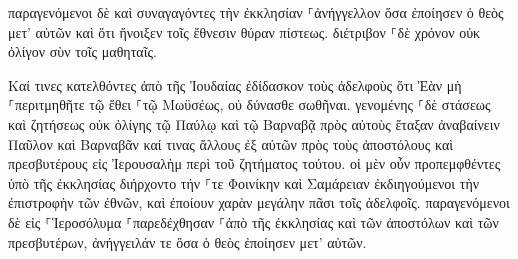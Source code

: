 \documentclass{openreader}
\begin{document}
παραγενόμενοι δὲ καὶ συναγαγόντες τὴν ἐκκλησίαν ⸀ἀνήγγελλον ὅσα ἐποίησεν ὁ θεὸς μετ’ αὐτῶν καὶ ὅτι ἤνοιξεν τοῖς ἔθνεσιν θύραν πίστεως. 
διέτριβον ⸀δὲ χρόνον οὐκ ὀλίγον σὺν τοῖς μαθηταῖς. 

Καί τινες κατελθόντες ἀπὸ τῆς Ἰουδαίας ἐδίδασκον τοὺς ἀδελφοὺς ὅτι Ἐὰν μὴ ⸀περιτμηθῆτε τῷ ἔθει ⸀τῷ Μωϋσέως, οὐ δύνασθε σωθῆναι. 
γενομένης ⸀δὲ στάσεως καὶ ζητήσεως οὐκ ὀλίγης τῷ Παύλῳ καὶ τῷ Βαρναβᾷ πρὸς αὐτοὺς ἔταξαν ἀναβαίνειν Παῦλον καὶ Βαρναβᾶν καί τινας ἄλλους ἐξ αὐτῶν πρὸς τοὺς ἀποστόλους καὶ πρεσβυτέρους εἰς Ἰερουσαλὴμ περὶ τοῦ ζητήματος τούτου. 
οἱ μὲν οὖν προπεμφθέντες ὑπὸ τῆς ἐκκλησίας διήρχοντο τήν ⸀τε Φοινίκην καὶ Σαμάρειαν ἐκδιηγούμενοι τὴν ἐπιστροφὴν τῶν ἐθνῶν, καὶ ἐποίουν χαρὰν μεγάλην πᾶσι τοῖς ἀδελφοῖς. 
παραγενόμενοι δὲ εἰς ⸀Ἱεροσόλυμα ⸀παρεδέχθησαν ⸀ἀπὸ τῆς ἐκκλησίας καὶ τῶν ἀποστόλων καὶ τῶν πρεσβυτέρων, ἀνήγγειλάν τε ὅσα ὁ θεὸς ἐποίησεν μετ’ αὐτῶν. 
\end{document}
